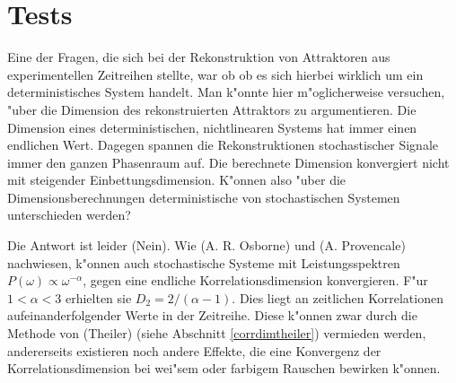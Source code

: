 \newpage \newpage
\section{Tests}
Eine der Fragen, die sich bei der Rekonstruktion von Attraktoren aus experimentellen
Zeitreihen stellte, war ob ob es sich hierbei wirklich um ein deterministisches System
handelt.  Man k"onnte hier m"oglicherweise versuchen, "uber die Dimension des
rekonstruierten Attraktors zu argumentieren. Die Dimension eines deterministischen,
nichtlinearen Systems hat immer einen endlichen Wert. Dagegen spannen die Rekonstruktionen
stochastischer Signale immer den ganzen Phasenraum auf. Die berechnete Dimension
konvergiert nicht mit steigender Einbettungsdimension. K"onnen also "uber die
Dimensionsberechnungen deterministische von stochastischen Systemen unterschieden werden?

Die Antwort ist leider \naja(Nein). Wie \autor(A. R. Osborne) und \autor(A. Provencale)
nachwiesen, k"onnen auch stochastische Systeme mit Leistungsspektren
$P(\omega)\propto\omega^{-\alpha}$, gegen eine endliche Korrelationsdimension
konvergieren\cite{Osborne89a}. F"ur $1<\alpha<3$ erhielten sie $D_2=2/(\alpha-1)$.  Dies
liegt an zeitlichen Korrelationen aufeinanderfolgender Werte in der Zeitreihe. Diese
k"onnen zwar durch die Methode von \autor(Theiler) (siehe Abschnitt \ref{corrdimtheiler})
vermieden werden, andererseits existieren noch andere Effekte, die eine Konvergenz der
Korrelationsdimension bei wei"sem oder farbigem Rauschen bewirken k"onnen.


